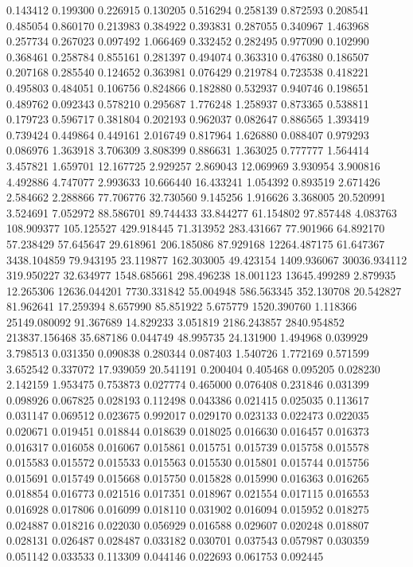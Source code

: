 0.143412
0.199300
0.226915
0.130205
0.516294
0.258139
0.872593
0.208541
0.485054
0.860170
0.213983
0.384922
0.393831
0.287055
0.340967
1.463968
0.257734
0.267023
0.097492
1.066469
0.332452
0.282495
0.977090
0.102990
0.368461
0.258784
0.855161
0.281397
0.494074
0.363310
0.476380
0.186507
0.207168
0.285540
0.124652
0.363981
0.076429
0.219784
0.723538
0.418221
0.495803
0.484051
0.106756
0.824866
0.182880
0.532937
0.940746
0.198651
0.489762
0.092343
0.578210
0.295687
1.776248
1.258937
0.873365
0.538811
0.179723
0.596717
0.381804
0.202193
0.962037
0.082647
0.886565
1.393419
0.739424
0.449864
0.449161
2.016749
0.817964
1.626880
0.088407
0.979293
0.086976
1.363918
3.706309
3.808399
0.886631
1.363025
0.777777
1.564414
3.457821
1.659701
12.167725
2.929257
2.869043
12.069969
3.930954
3.900816
4.492886
4.747077
2.993633
10.666440
16.433241
1.054392
0.893519
2.671426
2.584662
2.288866
77.706776
32.730560
9.145256
1.916626
3.368005
20.520991
3.524691
7.052972
88.586701
89.744433
33.844277
61.154802
97.857448
4.083763
108.909377
105.125527
429.918445
71.313952
283.431667
77.901966
64.892170
57.238429
57.645647
29.618961
206.185086
87.929168
12264.487175
61.647367
3438.104859
79.943195
23.119877
162.303005
49.423154
1409.936067
30036.934112
319.950227
32.634977
1548.685661
298.496238
18.001123
13645.499289
2.879935
12.265306
12636.044201
7730.331842
55.004948
586.563345
352.130708
20.542827
81.962641
17.259394
8.657990
85.851922
5.675779
1520.390760
1.118366
25149.080092
91.367689
14.829233
3.051819
2186.243857
2840.954852
213837.156468
35.687186
0.044749
48.995735
24.131900
1.494968
0.039929
3.798513
0.031350
0.090838
0.280344
0.087403
1.540726
1.772169
0.571599
3.652542
0.337072
17.939059
20.541191
0.200404
0.405468
0.095205
0.028230
2.142159
1.953475
0.753873
0.027774
0.465000
0.076408
0.231846
0.031399
0.098926
0.067825
0.028193
0.112498
0.043386
0.021415
0.025035
0.113617
0.031147
0.069512
0.023675
0.992017
0.029170
0.023133
0.022473
0.022035
0.020671
0.019451
0.018844
0.018639
0.018025
0.016630
0.016457
0.016373
0.016317
0.016058
0.016067
0.015861
0.015751
0.015739
0.015758
0.015578
0.015583
0.015572
0.015533
0.015563
0.015530
0.015801
0.015744
0.015756
0.015691
0.015749
0.015668
0.015750
0.015828
0.015990
0.016363
0.016265
0.018854
0.016773
0.021516
0.017351
0.018967
0.021554
0.017115
0.016553
0.016928
0.017806
0.016099
0.018110
0.031902
0.016094
0.015952
0.018275
0.024887
0.018216
0.022030
0.056929
0.016588
0.029607
0.020248
0.018807
0.028131
0.026487
0.028487
0.033182
0.030701
0.037543
0.057987
0.030359
0.051142
0.033533
0.113309
0.044146
0.022693
0.061753
0.092445
